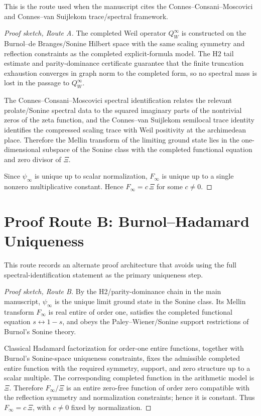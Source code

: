 \documentclass[11pt]{article}
\newcommand{\XiF}{\Xi}
\newcommand{\Finf}{F_{\infty}}
\newcommand{\psiinf}{\psi_{\infty}}
\newcommand{\QWinf}{Q_{W}^{\infty}}
\begin{document}
This is the route used when the manuscript cites the Connes--Consani--Moscovici
and Connes--van Suijlekom trace/spectral framework.

\begin{proof}[Proof sketch, Route A]
The completed Weil operator $\QWinf$ is constructed on the Burnol--de
Branges/Sonine Hilbert space with the same scaling symmetry and reflection
constraints as the completed explicit-formula model.  The H2 tail estimate and
parity-dominance certificate guarantee that the finite truncation exhaustion
converges in graph norm to the completed form, so no spectral mass is lost in
the passage to $\QWinf$.

The Connes--Consani--Moscovici spectral identification relates the relevant
prolate/Sonine spectral data to the squared imaginary parts of the nontrivial
zeros of the zeta function, and the Connes--van Suijlekom semilocal trace
identity identifies the compressed scaling trace with Weil positivity at the
archimedean place.  Therefore the Mellin transform of the limiting ground state
lies in the one-dimensional subspace of the Sonine class with the completed
functional equation and zero divisor of $\XiF$.

Since $\psiinf$ is unique up to scalar normalization, $\Finf$ is unique up to a
single nonzero multiplicative constant.  Hence $\Finf=c\,\XiF$ for some
$c\neq 0$.
\end{proof}

\section{Proof Route B: Burnol--Hadamard Uniqueness}

This route records an alternate proof architecture that avoids using the full
spectral-identification statement as the primary uniqueness step.

\begin{proof}[Proof sketch, Route B]
By the H2/parity-dominance chain in the main manuscript, $\psiinf$ is the unique
limit ground state in the Sonine class.  Its Mellin transform $\Finf$ is real
entire of order one, satisfies the completed functional equation
$s\leftrightarrow 1-s$, and obeys the Paley--Wiener/Sonine support restrictions
of Burnol's Sonine theory.

Classical Hadamard factorization for order-one entire functions, together with
Burnol's Sonine-space uniqueness constraints, fixes the admissible completed
entire function with the required symmetry, support, and zero structure up to a
scalar multiple.  The corresponding completed function in the arithmetic model
is $\XiF$.  Therefore $\Finf/\XiF$ is an entire zero-free function of order zero
compatible with the reflection symmetry and normalization constraints; hence it
is constant.  Thus $\Finf=c\,\XiF$, with $c\neq0$ fixed by normalization.
\end{proof}
\end{document}
